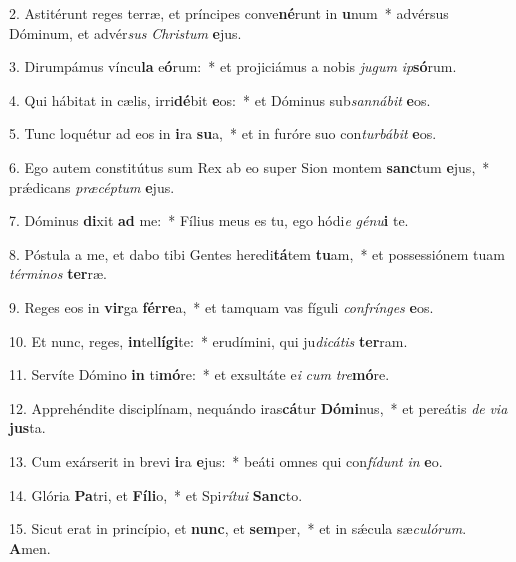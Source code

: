 2. Astitérunt reges terræ, et príncipes conve\textbf{né}runt in \textbf{u}num~*  advérsus Dóminum, et advér\textit{sus} \textit{Chris}\textit{tum} \textbf{e}jus.\

3. Dirumpámus víncu\textbf{la} e\textbf{ó}rum:~*  et projiciámus a nobis \textit{ju}\textit{gum} \textit{ip}\textbf{só}rum.\

4. Qui hábitat in cælis, irri\textbf{dé}bit \textbf{e}os:~*  et Dóminus sub\textit{san}\textit{ná}\textit{bit} \textbf{e}os.\

5. Tunc loquétur ad eos in \textbf{i}ra \textbf{su}a,~*  et in furóre suo con\textit{tur}\textit{bá}\textit{bit} \textbf{e}os.\

6. Ego autem constitútus sum Rex ab eo super Sion montem \textbf{sanc}tum \textbf{e}jus,~*  prǽdicans \textit{præ}\textit{cép}\textit{tum} \textbf{e}jus.\

7. Dóminus \textbf{di}xit \textbf{ad} me:~*  Fílius meus es tu, ego hódi\textit{e} \textit{gé}\textit{nu}\textbf{i} te.\

8. Póstula a me, et dabo tibi Gentes heredi\textbf{tá}tem \textbf{tu}am,~*  et possessiónem tuam \textit{tér}\textit{mi}\textit{nos} \textbf{ter}ræ.\

9. Reges eos in \textbf{vir}ga \textbf{fér}\textbf{re}a,~*  et tamquam vas fíguli \textit{con}\textit{frín}\textit{ges} \textbf{e}os.\

10. Et nunc, reges, \textbf{in}tel\textbf{lí}\textbf{gi}te:~*  erudímini, qui ju\textit{di}\textit{cá}\textit{tis} \textbf{ter}ram.\

11. Servíte Dómino \textbf{in} ti\textbf{mó}re:~*  et exsultáte e\textit{i} \textit{cum} \textit{tre}\textbf{mó}re.\

12. Apprehéndite disciplínam, nequándo iras\textbf{cá}tur \textbf{Dó}\textbf{mi}nus,~*  et pereátis \textit{de} \textit{vi}\textit{a} \textbf{jus}ta.\

13. Cum exárserit in brevi \textbf{i}ra \textbf{e}jus:~*  beáti omnes qui con\textit{fí}\textit{dunt} \textit{in} \textbf{e}o.\

14. Glória \textbf{Pa}tri, et \textbf{Fí}\textbf{li}o,~*  et Spi\textit{rí}\textit{tu}\textit{i} \textbf{Sanc}to.\

15. Sicut erat in princípio, et \textbf{nunc}, et \textbf{sem}per,~*  et in sǽcula sæ\textit{cu}\textit{ló}\textit{rum}. \textbf{A}men.\

